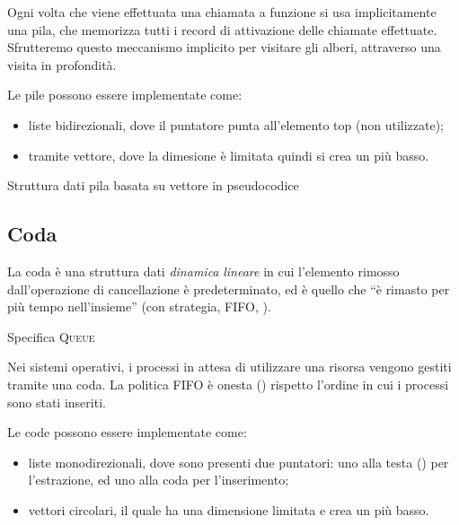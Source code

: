 Ogni volta che viene effettuata una chiamata a funzione si usa implicitamente una pila, che memorizza tutti i record di attivazione delle chiamate effettuate.
Sfrutteremo questo meccanismo implicito per visitare gli alberi, attraverso una visita in profondità.

Le pile possono essere implementate come:
\begin{itemize}
	\item liste bidirezionali, dove il puntatore punta all'elemento \textsf{top} (non utilizzate);
	\item tramite vettore, dove la dimesione è limitata quindi si crea un  più basso.
\end{itemize}

\begin{algorithm}[H]
	\caption{Struttura dati pila basata su vettore in pseudocodice}
	
\end{algorithm}

\begin{code}
	\label{code:vector-stack}
\end{code}

\clearpage
\subsection{Coda}

La coda è una struttura dati \emph{dinamica} \emph{lineare} in cui l'elemento rimosso dall'operazione di cancellazione è predeterminato, ed è quello che \enquote{è rimasto per più tempo nell'insieme} (con strategia, \textsc{FIFO}, ).

\begin{algorithm}[H]
	\caption[Specifica coda]{Specifica \textsc{Queue}}
	
\end{algorithm}

Nei sistemi operativi, i processi in attesa di utilizzare una risorsa vengono gestiti tramite una coda.
La politica \textsc{FIFO} è onesta () rispetto l'ordine in cui i processi sono stati inseriti.

Le code possono essere implementate come:
\begin{itemize}
	\item liste monodirezionali, dove sono presenti due puntatori: uno alla testa () per l'estrazione, ed uno alla coda per l'inserimento;
	\item vettori circolari, il quale ha una dimensione limitata e crea un  più basso.
\end{itemize}

